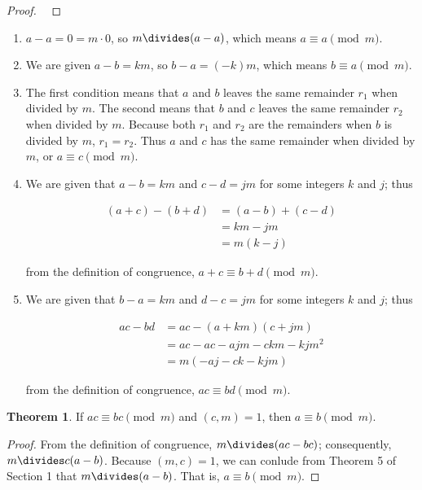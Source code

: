 \documentclass{article}
\theoremstyle{definition} %
\newtheorem{theorem}{Theorem}[section] %
\theoremstyle{definition}
\theoremstyle{definition}
\theoremstyle{definition}
\begin{document}
  \begin{proof}
    ~
  \end{proof}
  
  \begin{enumerate}[label=\alph*)]
    \item $a - a = 0 = m \cdot 0$, so $m \divides (a - a)$, which means $a \equiv a \pmod{m}$.
    \item We are given $a - b = km$, so $b - a = (-k)m$, which means $b \equiv a \pmod{m}$.
    \item The first condition means that $a$ and $b$ leaves the same remainder $r_1$ when divided by $m$.
      The second means that $b$ and $c$ leaves the same remainder $r_2$ when divided by $m$.
      Because both $r_1$ and $r_2$ are the remainders when $b$ is divided by $m$, $r_1 = r_2$.
      Thus $a$ and $c$ has the same remainder when divided by $m$, or $a \equiv c \pmod{m}$.
    \item We are given that $a - b = km$ and $c - d = jm$ for some integers $k$ and $j$; thus
    
    \begin{align*}
      (a + c) - (b + d) &= (a - b) + (c - d) \\
        &= km - jm \\
        &= m(k - j)
    \end{align*}
    
    from the definition of congruence, $a + c \equiv b + d \pmod{m}$.
    
    \item We are given that $b - a = km$ and $d - c = jm$ for some integers $k$ and $j$; thus
    
    \begin{align*}
      ac - bd &= ac - (a + km)(c + jm) \\
        &= ac - ac - ajm - ckm - kjm^2 \\
        &= m (-aj -ck - kjm)
    \end{align*}
    
    from the definition of congruence, $ac \equiv bd \pmod{m}$.
  \end{enumerate}
  
  \begin{theorem}
    If $ac \equiv bc \pmod{m}$ and $(c, m) = 1$, then $a \equiv b \pmod{m}$.
  \end{theorem}
  
  \begin{proof}
    From the definition of congruence, $m \divides (ac - bc)$; consequently, $m \divides c(a - b)$.
    Because $(m, c) = 1$, we can conlude from Theorem 5 of Section 1 that $m \divides (a - b)$.
    That is, $a \equiv b \pmod{m}$.
  \end{proof}
  
\end{document}
